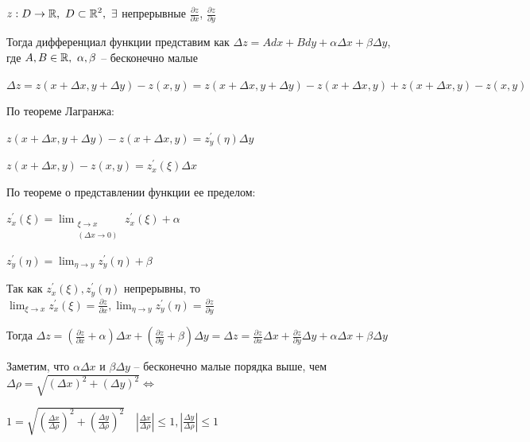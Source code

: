 \documentclass[12pt]{article}
\begin{document}
    \begin{MyTheorem}
        \Ths $\displaystyle z : D \rightarrow \mathbb{R}, \ D \subset \mathbb{R}^2, \ \exists$
        непрерывные $\displaystyle \frac{\partial z}{\partial x}$, $\displaystyle \frac{\partial z}{\partial y}$

        Тогда дифференциал функции представим как $\displaystyle \Delta z = A dx + B dy + \alpha \Delta x + \beta \Delta y$, где $\displaystyle A, B \in \mathbb{R}, \ \alpha, \beta$ -- бесконечно малые
    \end{MyTheorem}

    \begin{MyProof}
        $\displaystyle \Delta z = z (x + \Delta x, y + \Delta y) - z (x, y) = z(x + \Delta x, y + \Delta y) - z(x + \Delta x, y) +
        z(x + \Delta x, y) - z(x, y)$

        По теореме Лагранжа:

        $\displaystyle z(x + \Delta x, y + \Delta y) - z(x + \Delta x, y) = z^\prime_y(\eta) \Delta y$

        $\displaystyle z(x + \Delta x, y) - z(x, y) = z^\prime_x(\xi)\Delta x$

        По теореме о представлении функции ее пределом:

        $\displaystyle z^\prime_x(\xi) = \lim_{\substack{\xi \to x \\ (\Delta x \to 0)}} z^\prime_x(\xi) + \alpha$

        $\displaystyle z^\prime_y(\eta) = \lim_{\eta \to y} z^\prime_y(\eta) + \beta$

        Так как $\displaystyle z^\prime_x(\xi), z^\prime_y(\eta)$ непрерывны, то $\displaystyle \lim_{\xi \to x} z^\prime_x(\xi) = \frac{\partial z}{\partial x}, \lim_{\eta \to y} z^\prime_y(\eta) = \frac{\partial z}{\partial y}$

        Тогда $\displaystyle \Delta z = \left(\frac{\partial z}{\partial x} + \alpha\right) \Delta x + \left(\frac{\partial z}{\partial y} + \beta\right)\Delta y =
        \Delta z = \frac{\partial z}{\partial x}\Delta x + \frac{\partial z}{\partial y}\Delta y + \alpha \Delta x + \beta \Delta y$
    \end{MyProof}

    Заметим, что $\displaystyle \alpha \Delta x$ и $\displaystyle \beta \Delta y$ -- бесконечно малые порядка выше, чем $\displaystyle \Delta \rho = \sqrt{(\Delta x)^2 + (\Delta y)^2} \Longleftrightarrow$

    $\displaystyle 1 = \sqrt{\left(\frac{\Delta x}{\Delta \rho}\right)^2 + \left(\frac{\Delta y}{\Delta \rho}\right)^2} \quad \left|\frac{\Delta x}{\Delta \rho}\right| \leq 1, \left|\frac{\Delta y}{\Delta \rho}\right| \leq 1$
\end{document}
